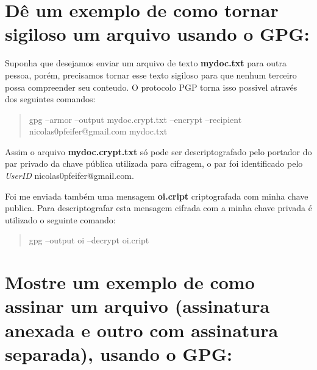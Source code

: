 \documentclass[12pt, letterpaper]{article}
\begin{document}
\section{Dê um exemplo de como tornar sigiloso um arquivo usando o GPG:}

Suponha que desejamos enviar um arquivo de texto \textbf{mydoc.txt} para outra pessoa, porém,
precisamos tornar esse texto sigiloso para que nenhum terceiro possa compreender seu conteudo.
O protocolo PGP torna isso possivel através dos seguintes comandos:
\begin{quote}
  gpg --armor --output mydoc.crypt.txt --encrypt --recipient nicolas0pfeifer@gmail.com mydoc.txt
\end{quote}
Assim o arquivo \textbf{mydoc.crypt.txt} só pode ser descriptografado pelo portador do par privado da chave pública utilizada
para cifragem, o par foi identificado pelo \textit{UserID} nicolas0pfeifer@gmail.com.

Foi me enviada também uma mensagem \textbf{oi.cript} criptografada com minha chave publica.
Para descriptografar esta mensagem cifrada com a minha chave privada é utilizado o seguinte comando:
\begin{quote}
  gpg --output oi --decrypt oi.cript
\end{quote}

\section{Mostre um exemplo de como assinar um arquivo (assinatura anexada e outro com assinatura separada), usando o GPG:}
\end{document}
